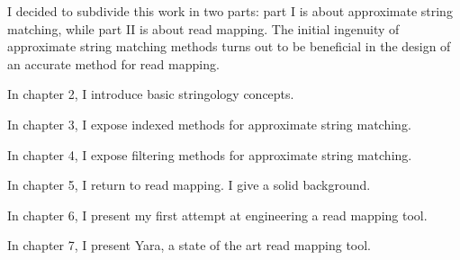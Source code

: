 
I decided to subdivide this work in two parts: part I is about approximate string matching, while part II is about read mapping.
The initial ingenuity of approximate string matching methods turns out to be beneficial in the design of an accurate method for read mapping.

In chapter 2, I introduce basic stringology concepts. 

In chapter 3, I expose indexed methods for approximate string matching.

In chapter 4, I expose filtering methods for approximate string matching.

In chapter 5, I return to read mapping. I give a solid background.

In chapter 6, I present my first attempt at engineering a read mapping tool.

In chapter 7, I present Yara, a state of the art read mapping tool.

